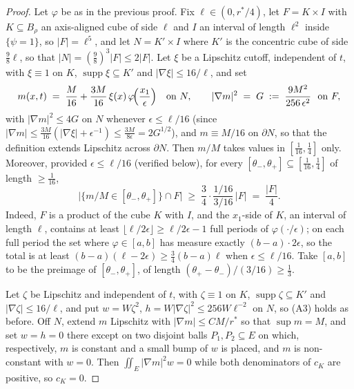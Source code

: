 \documentclass[11pt]{article}
\theoremstyle{definition}
\theoremstyle{remark}
\begin{document}
\begin{proof}
  Let $\varphi$ be as in the previous proof. Fix $\ell\in(0,r^*/4)$, let
  $F=K\times I$ with $K\subseteq B_\rho$ an axis-aligned cube of side $\ell$
  and $I$ an interval of length $\ell^2$ inside $\{\psi=1\}$, so
  $|F|=\ell^5$, and let $N=K'\times I$ where $K'$ is the concentric cube of
  side $\tfrac98\ell$, so that $|N|=(\tfrac98)^3|F|\leq2|F|$. Let $\xi$ be a
  Lipschitz cutoff, independent of $t$, with $\xi\equiv1$ on $K$,
  $\operatorname{supp}\xi\subseteq K'$ and $|\nabla\xi|\leq16/\ell$, and set
  \[
    m(x,t)\;=\;\frac{M}{16}+\frac{3M}{16}\,\xi(x)\,
      \varphi\!\Bigl(\frac{x_1}{\epsilon}\Bigr)
    \quad\text{on }N,
    \qquad
    |\nabla m|^2\;=\;G\;:=\;\frac{9M^2}{256\,\epsilon^2}\ \text{ on }F ,
  \]
  with $|\nabla m|^2\leq4G$ on $N$ whenever $\epsilon\leq\ell/16$ (since
  $|\nabla m|\leq\tfrac{3M}{16}(|\nabla\xi|+\epsilon^{-1})
  \leq\tfrac{3M}{8\epsilon}=2G^{1/2}$), and $m\equiv M/16$ on $\partial N$, so
  that the definition extends Lipschitz across $\partial N$.
  Then $m/M$ takes values in $[\tfrac1{16},\tfrac14]$ only. Moreover, provided
  $\epsilon\leq\ell/16$ (verified below), for every
  $[\theta_-,\theta_+]\subseteq[\tfrac1{16},\tfrac14]$ of length
  $\geq\tfrac1{16}$,
  \begin{equation}\label{eq:s44-thirdmass}
    \bigl|\{m/M\in[\theta_-,\theta_+]\}\cap F\bigr|
    \;\geq\;\frac34\cdot\frac{1/16}{3/16}\,|F| \;=\;\frac{|F|}{4}.
  \end{equation}
  Indeed, $F$ is a product of the cube $K$ with $I$, and the $x_1$-side of $K$,
  an interval of length $\ell$, contains at least
  $\lfloor \ell/2\epsilon\rfloor\geq \ell/2\epsilon-1$ full periods of
  $\varphi(\cdot/\epsilon)$; on each full period the set where
  $\varphi\in[a,b]$ has measure exactly $(b-a)\cdot2\epsilon$, so the total is
  at least $(b-a)(\ell-2\epsilon)\geq\tfrac34(b-a)\ell$ when
  $\epsilon\leq\ell/16$. Take $[a,b]$ to be the preimage of
  $[\theta_-,\theta_+]$, of length $(\theta_+-\theta_-)/(3/16)\geq\tfrac13$.

  Let $\zeta$ be Lipschitz and independent of $t$, with $\zeta\equiv1$ on $K$,
  $\operatorname{supp}\zeta\subseteq K'$ and $|\nabla\zeta|\leq16/\ell$, and put
  $w=W\zeta^2$, $h=W|\nabla\zeta|^2\leq 256W\ell^{-2}$ on $N$, so (A3) holds as
  before. Off $N$, extend $m$ Lipschitz with $|\nabla m|\leq CM/r^*$ so that
  $\sup m=M$, and set $w=h=0$ there except on two disjoint balls
  $P_1,P_2\subseteq E$ on which, respectively, $m$ is constant and a small
  bump of $w$ is placed, and $m$ is non-constant with $w=0$. Then
  $\iint_E|\nabla m|^2w=0$ while both denominators of $c_K$ are positive, so
  $c_K=0$.


\end{proof}
\end{document}
